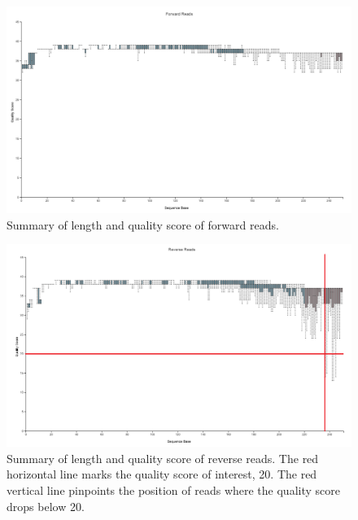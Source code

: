 \documentclass{singlecol-new}
\theoremstyle{TH}{
\newtheorem{lemma}{Lemma}
\newtheorem{theorem}[lemma]{Theorem}
\newtheorem{corrolary}[lemma]{Corrolary}
\newtheorem{conjecture}[lemma]{Conjecture}
\newtheorem{proposition}[lemma]{Proposition}
\newtheorem{claim}[lemma]{Claim}
\newtheorem{stheorem}[lemma]{Wrong Theorem}
\newtheorem{algorithm}{Algorithm}
}
\theoremstyle{THrm}{
\newtheorem{definition}{Definition}[section]
\newtheorem{question}{Question}[section]
\newtheorem{remark}{Remark}
\newtheorem{scheme}{Scheme}
}
\theoremstyle{THhit}{
\newtheorem{case}{Case}[section]
}
\begin{document}
\begin{figure}[htbp]
\centerline{\includegraphics[scale=0.25]{figures/forward_read.png}}
\caption{Summary of length and quality score of forward reads.}
\label{fig. 9}
\end{figure}

\begin{figure}[htbp]
\centerline{\includegraphics[scale=0.25]{figures/reverse_read.png}}
\caption{Summary of length and quality score of reverse reads. The red horizontal line marks the quality score of interest, 20. The red vertical line pinpoints the position of reads where the quality score drops below 20.}
\label{fig. 10}
\end{figure}

\pagebreak



\end{document}
